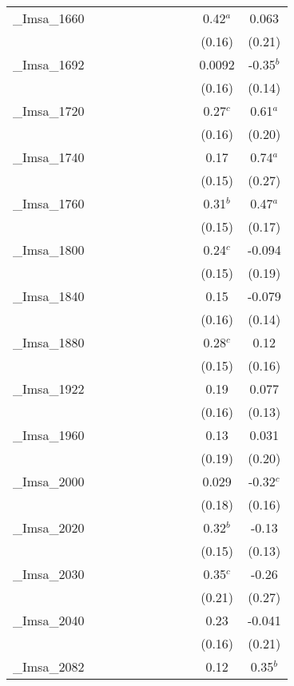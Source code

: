 \documentclass[]{article}
\begin{document}
\begin{tabular}{lcccccccccc}
\_Imsa\_1660 &  &  &  &  &  &  &  &  & 0.42$^a$ & 0.063 \\
 &  &  &  &  &  &  &  &  & (0.16) & (0.21) \\
\_Imsa\_1692 &  &  &  &  &  &  &  &  & 0.0092 & -0.35$^b$ \\
 &  &  &  &  &  &  &  &  & (0.16) & (0.14) \\
\_Imsa\_1720 &  &  &  &  &  &  &  &  & 0.27$^c$ & 0.61$^a$ \\
 &  &  &  &  &  &  &  &  & (0.16) & (0.20) \\
\_Imsa\_1740 &  &  &  &  &  &  &  &  & 0.17 & 0.74$^a$ \\
 &  &  &  &  &  &  &  &  & (0.15) & (0.27) \\
\_Imsa\_1760 &  &  &  &  &  &  &  &  & 0.31$^b$ & 0.47$^a$ \\
 &  &  &  &  &  &  &  &  & (0.15) & (0.17) \\
\_Imsa\_1800 &  &  &  &  &  &  &  &  & 0.24$^c$ & -0.094 \\
 &  &  &  &  &  &  &  &  & (0.15) & (0.19) \\
\_Imsa\_1840 &  &  &  &  &  &  &  &  & 0.15 & -0.079 \\
 &  &  &  &  &  &  &  &  & (0.16) & (0.14) \\
\_Imsa\_1880 &  &  &  &  &  &  &  &  & 0.28$^c$ & 0.12 \\
 &  &  &  &  &  &  &  &  & (0.15) & (0.16) \\
\_Imsa\_1922 &  &  &  &  &  &  &  &  & 0.19 & 0.077 \\
 &  &  &  &  &  &  &  &  & (0.16) & (0.13) \\
\_Imsa\_1960 &  &  &  &  &  &  &  &  & 0.13 & 0.031 \\
 &  &  &  &  &  &  &  &  & (0.19) & (0.20) \\
\_Imsa\_2000 &  &  &  &  &  &  &  &  & 0.029 & -0.32$^c$ \\
 &  &  &  &  &  &  &  &  & (0.18) & (0.16) \\
\_Imsa\_2020 &  &  &  &  &  &  &  &  & 0.32$^b$ & -0.13 \\
 &  &  &  &  &  &  &  &  & (0.15) & (0.13) \\
\_Imsa\_2030 &  &  &  &  &  &  &  &  & 0.35$^c$ & -0.26 \\
 &  &  &  &  &  &  &  &  & (0.21) & (0.27) \\
\_Imsa\_2040 &  &  &  &  &  &  &  &  & 0.23 & -0.041 \\
 &  &  &  &  &  &  &  &  & (0.16) & (0.21) \\
\_Imsa\_2082 &  &  &  &  &  &  &  &  & 0.12 & 0.35$^b$ \\

\end{tabular}
\end{document}
